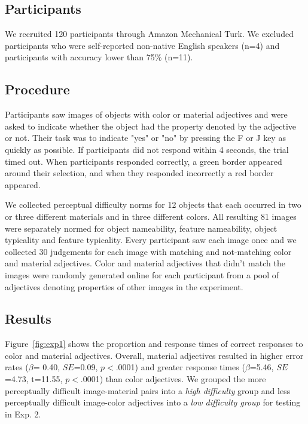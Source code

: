 \documentclass[12pt,letterpaper]{article}
\begin{document}
\subsection{Participants} 

We recruited 120 participants through Amazon Mechanical Turk. We excluded participants who were self-reported non-native English speakers (n=4) and participants with accuracy lower than 75\% (n=11).

\subsection{Procedure} 

Participants saw images of objects with color or material adjectives and were asked to indicate whether the object had the property denoted by the adjective or not. Their task was to indicate "yes" or "no" by pressing the F or J key as quickly as possible. If participants did not respond within 4 seconds, the trial timed out. When participants responded correctly, a green border appeared around their selection, and when they responded incorrectly a red border appeared.

We collected perceptual difficulty norms for 12 objects that each occurred in two or three different materials and in three different colors. All resulting 81 images were separately normed for object nameability, feature nameability, object typicality and feature typicality. Every participant saw each image once and we collected 30 judgements for each image with matching and not-matching color and material adjectives. Color and material adjectives that didn't match the images were randomly generated online for each participant from a pool of adjectives denoting properties of other images in the experiment.

\subsection{Results} 

Figure~\ref{fig:exp1} shows the proportion and response times of correct responses to color and material adjectives. Overall, material adjectives resulted in higher error rates ($\beta$= 0.40, $SE$=0.09, $p$$<$.0001) and greater response times ($\beta$=5.46, $SE$=4.73, t=11.55, $p$$<$.0001) than color adjectives. We grouped the more perceptually difficult image-material pairs into a \textit{high difficulty} group and less perceptually difficult image-color adjectives into a \textit{low difficulty group} for testing in Exp. 2.
\end{document}
